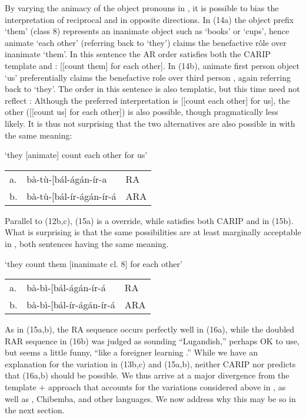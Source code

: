 \documentclass[output=paper,
modfonts
]{LSP/langsci}
\begin{document}
\noindent By varying the animacy of the object pronouns in , it is possible to
bias the  interpretation of reciprocal and  in opposite
directions. In (14a) the object prefix  `them' (class 8)
represents an inanimate object such as  `books' or
 `cups', hence animate `each other' (referring back to
 `they') claims the benefactive rôle over inanimate
 `them'. In this sentence the AR order 
satisfies both the CARIP template and : {[}{[}count them{]} for
each other{]}. In (14b), animate first person object  `us'
preferentially claims the benefactive role over third person
, again referring back to  `they'. The
 order in this sentence is also templatic, but this time
need not reflect : Although the preferred interpretation is
{[}{[}count each other{]} for us{]}, the other  ({[}{[}count us{]} for each other{]}) is also possible, though pragmatically less
likely. It is thus not surprising that the two alternatives are also
possible in  with the same meaning:

\ea \label{ex:hyman:15}`they {[}animate{]} count each other for us'\\
\begin{tabular}{@{}lll@{}}
a. & bà-tù-{[}bál-ágán-ír-a & RA \\
b. & bà-tù-{[}bál-ír-ágán-ír-á & ARA \\
\end{tabular}
\z

\noindent Parallel to (12b,c), (15a) is a  override, while
 satisfies both CARIP and  in (15b). What is
surprising is that the same possibilities are at least marginally
acceptable in , both sentences having the same meaning.

\ea \label{ex:hyman:16} `they count them {[}inanimate cl. 8{]} for each other'\\
\begin{tabular}{@{}lll@{}}
a. & bà-bì-{[}bál-ágán-ír-á & RA \\
b. & \ljudge{??}bà-bì-{[}bál-ír-ágán-ír-á & ARA \\
\end{tabular}
\z

\noindent As in (15a,b), the RA sequence occurs perfectly well in (16a), while the
doubled RAR sequence in (16b) was judged as sounding ``Lugandish,''
perhaps OK to use, but seems a little funny, ``like a foreigner learning
.'' While we have an explanation for the variation in (13b,c) and
(15a,b), neither CARIP nor  predicts that (16a,b) should be
possible. We thus arrive at a major divergence from the template + 
approach that accounts for the variations considered above in , as
well as , Chibemba, and other  languages. We now address
why this may be so in the next section.
\end{document}
